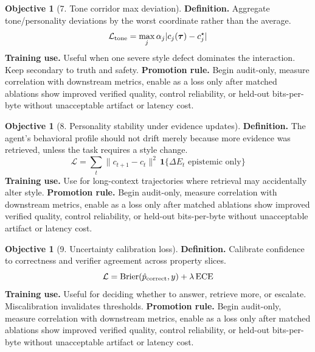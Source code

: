 \documentclass[11pt]{article}
\theoremstyle{definition}
\newtheorem{objective}[theorem]{Objective}
\theoremstyle{remark}
\newcommand{\loss}{\mathcal{L}}
\newcommand{\traj}{\boldsymbol{\tau}}
\numberwithin{equation}{section}
\begin{document}
\begin{objective}[7. Tone corridor max deviation]
\textbf{Definition.} Aggregate tone/personality deviations by the worst coordinate rather than the average.
\begin{equation}
    \loss_{\rm tone}=\max_j \alpha_j |c_j(\traj)-c_j^\star|
\end{equation}
\textbf{Training use.} Useful when one severe style defect dominates the interaction. Keep secondary to truth and safety.
\textbf{Promotion rule.} Begin audit-only, measure correlation with downstream metrics, enable as a loss only after matched ablations show improved verified quality, control reliability, or held-out bits-per-byte without unacceptable artifact or latency cost.
\end{objective}


\begin{objective}[8. Personality stability under evidence updates]
\textbf{Definition.} The agent's behavioral profile should not drift merely because more evidence was retrieved, unless the task requires a style change.
\begin{equation}
    \loss=\sum_t \|c_{t+1}-c_t\|^2\,\mathbf 1\{\Delta E_t\text{ epistemic only}\}
\end{equation}
\textbf{Training use.} Use for long-context trajectories where retrieval may accidentally alter style.
\textbf{Promotion rule.} Begin audit-only, measure correlation with downstream metrics, enable as a loss only after matched ablations show improved verified quality, control reliability, or held-out bits-per-byte without unacceptable artifact or latency cost.
\end{objective}


\begin{objective}[9. Uncertainty calibration loss]
\textbf{Definition.} Calibrate confidence to correctness and verifier agreement across property slices.
\begin{equation}
    \loss=\operatorname{Brier}(\hat p_{\rm correct},y)+\lambda\operatorname{ECE}
\end{equation}
\textbf{Training use.} Useful for deciding whether to answer, retrieve more, or escalate. Miscalibration invalidates thresholds.
\textbf{Promotion rule.} Begin audit-only, measure correlation with downstream metrics, enable as a loss only after matched ablations show improved verified quality, control reliability, or held-out bits-per-byte without unacceptable artifact or latency cost.
\end{objective}
\end{document}
